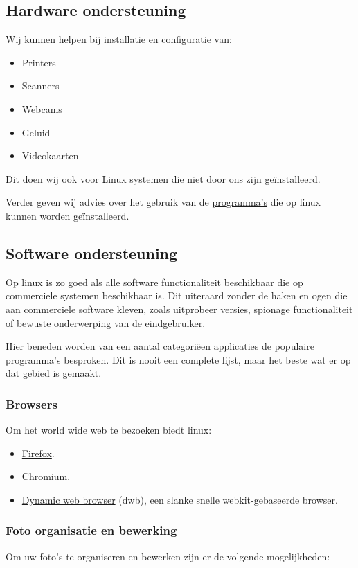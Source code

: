 \subsection{Hardware ondersteuning}
Wij kunnen helpen bij installatie en configuratie van:
\begin{itemize}
	\item Printers
	\item Scanners
	\item Webcams
	\item Geluid
	\item Videokaarten
\end{itemize}
Dit doen wij ook voor Linux systemen die niet door ons zijn ge\"{i}nstalleerd.

Verder geven wij advies over het gebruik van de \href{https://packages.debian.org/stable/}{programma's} die op linux kunnen worden ge\"{i}nstalleerd.

\subsection{Software ondersteuning}
Op linux is zo goed als alle software functionaliteit beschikbaar die op commerciele systemen beschikbaar is. Dit uiteraard zonder de haken en ogen die aan commerciele software kleven, zoals uitprobeer versies, spionage functionaliteit of bewuste onderwerping van de eindgebruiker. 

Hier beneden worden van een aantal categori\"{e}en applicaties de populaire programma's besproken. Dit is nooit een complete lijst, maar het beste wat er op dat gebied is gemaakt.

\subsubsection{Browsers}
Om het world wide web te bezoeken biedt linux:

\begin{itemize}
	\item \href{https://www.mozilla.org/nl/firefox/new/}{Firefox}.
	\item \href{http://www.chromium.org/}{Chromium}.
	\item \href{http://portix.bitbucket.org/dwb/}{Dynamic web browser} (dwb), een slanke snelle webkit-gebaseerde browser.
\end{itemize}

\subsubsection{Foto organisatie en bewerking}
Om uw foto's te organiseren en bewerken zijn er de volgende mogelijkheden:

